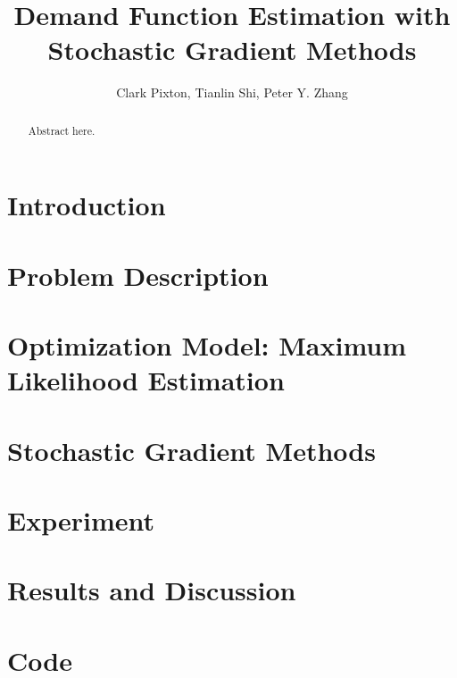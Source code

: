 \documentclass[12pt]{report}
\title{	\textbf{Demand Function Estimation with Stochastic Gradient Methods}}
\author{
	Clark Pixton, Tianlin Shi, Peter Y. Zhang}
\begin{document}
\maketitle
\tableofcontents


\begin{abstract}
Abstract here.
\end{abstract}


\chapter{Introduction}\label{ch:introduction}



\chapter{Problem Description}\label{ch:problem}


\chapter{Optimization Model: Maximum Likelihood Estimation}\label{ch:model}



\chapter{Stochastic Gradient Methods}\label{ch:method}


\chapter{Experiment}\label{ch:experiment}

\chapter{Results and Discussion}\label{ch:result}


%
%

\appendix \label{appendix}


\chapter{Code}\label{app:code}
\end{document}

